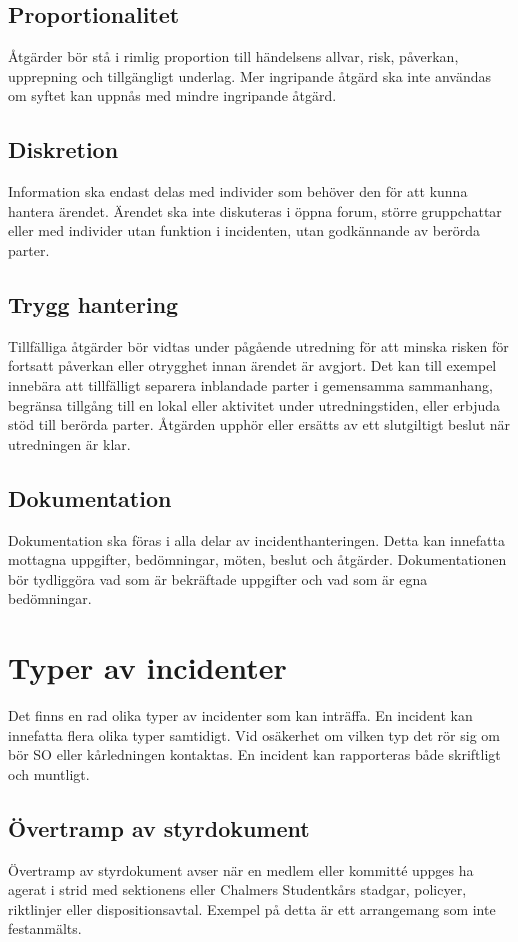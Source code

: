 \subsection{Proportionalitet}
Åtgärder bör stå i rimlig proportion till händelsens allvar, risk, påverkan, upprepning och tillgängligt underlag. Mer ingripande åtgärd ska inte användas om syftet kan uppnås med mindre ingripande åtgärd.

\subsection{Diskretion}
Information ska endast delas med individer som behöver den för att kunna hantera ärendet. Ärendet ska inte diskuteras i öppna forum, större gruppchattar eller med individer utan funktion i incidenten, utan godkännande av berörda parter.

\subsection{Trygg hantering}
Tillfälliga åtgärder bör vidtas under pågående utredning för att minska risken för fortsatt påverkan eller otrygghet innan ärendet är avgjort. Det kan till exempel innebära att tillfälligt separera inblandade parter i gemensamma sammanhang, begränsa tillgång till en lokal eller aktivitet under utredningstiden, eller erbjuda stöd till berörda parter. Åtgärden upphör eller ersätts av ett slutgiltigt beslut när utredningen är klar.

\subsection{Dokumentation}
Dokumentation ska föras i alla delar av incidenthanteringen. Detta kan innefatta mottagna uppgifter, bedömningar, möten, beslut och åtgärder. Dokumentationen bör tydliggöra vad som är bekräftade uppgifter och vad som är egna bedömningar.

\section{Typer av incidenter}
Det finns en rad olika typer av incidenter som kan inträffa. En incident kan innefatta flera olika typer samtidigt. Vid osäkerhet om vilken typ det rör sig om bör SO eller kårledningen kontaktas. En incident kan rapporteras både skriftligt och muntligt.

\subsection{Övertramp av styrdokument}
Övertramp av styrdokument avser när en medlem eller kommitté uppges ha agerat i strid med sektionens eller Chalmers Studentkårs stadgar, policyer, riktlinjer eller dispositionsavtal. Exempel på detta är ett arrangemang som inte festanmälts.


